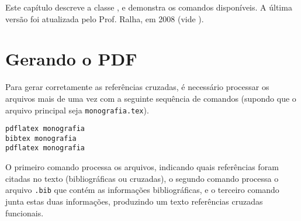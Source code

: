 \newcommand{\texCommand}[1]{\texttt{\textbackslash{#1}}}%

\newcommand{\exemplo}[1]{%
\vspace{\baselineskip}%
\noindent\fbox{\begin{minipage}{\textwidth}#1\end{minipage}}%
\\\vspace{\baselineskip}}%

\newcommand{\exemploVerbatim}[1]{%
\vspace{\baselineskip}%
\noindent\fbox{\begin{minipage}{\textwidth}%
#1\end{minipage}}%
\\\vspace{\baselineskip}}%


Este capítulo descreve a classe \unbcic, e demonstra os comandos disponíveis. A 
última versão foi atualizada pelo Prof. Ralha, em 2008 (vide ).


\section{Gerando o PDF}

Para gerar corretamente as referências cruzadas, é necessário processar os arquivos 
mais de uma vez com a seguinte sequência de comandos (supondo que o arquivo 
principal seja \texttt{monografia.tex}).

\begin{verbatim}
pdflatex monografia
bibtex monografia
pdflatex monografia
\end{verbatim}

O primeiro comando processa os arquivos, indicando quais referências foram citadas
no texto (bibliográficas ou cruzadas), o segundo comando processa o arquivo
\texttt{.bib} que contém as informações bibliográficas, e o terceiro comando junta
estas duas informações, produzindo um texto referências cruzadas funcionais.



